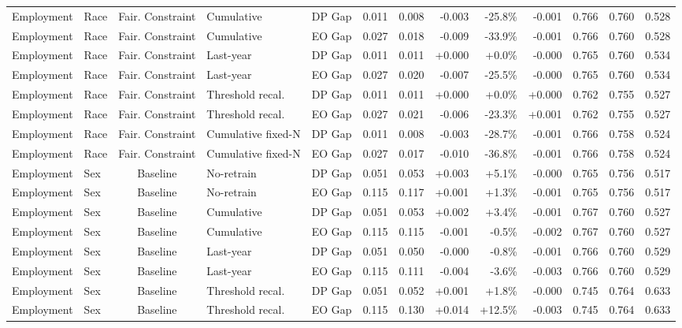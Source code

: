 \begin{longtable}{llcllrrrrrrrr}
Employment & Race & Fair. Constraint & Cumulative & DP Gap & 0.011 & 0.008 & -0.003 & -25.8\% & -0.001 & 0.766 & 0.760 & 0.528 \\
Employment & Race & Fair. Constraint & Cumulative & EO Gap & 0.027 & 0.018 & -0.009 & -33.9\% & -0.001 & 0.766 & 0.760 & 0.528 \\
Employment & Race & Fair. Constraint & Last-year & DP Gap & 0.011 & 0.011 & +0.000 & +0.0\% & -0.000 & 0.765 & 0.760 & 0.534 \\
Employment & Race & Fair. Constraint & Last-year & EO Gap & 0.027 & 0.020 & -0.007 & -25.5\% & -0.000 & 0.765 & 0.760 & 0.534 \\
Employment & Race & Fair. Constraint & Threshold recal. & DP Gap & 0.011 & 0.011 & +0.000 & +0.0\% & +0.000 & 0.762 & 0.755 & 0.527 \\
Employment & Race & Fair. Constraint & Threshold recal. & EO Gap & 0.027 & 0.021 & -0.006 & -23.3\% & +0.001 & 0.762 & 0.755 & 0.527 \\
Employment & Race & Fair. Constraint & Cumulative fixed-N & DP Gap & 0.011 & 0.008 & -0.003 & -28.7\% & -0.001 & 0.766 & 0.758 & 0.524 \\
Employment & Race & Fair. Constraint & Cumulative fixed-N & EO Gap & 0.027 & 0.017 & -0.010 & -36.8\% & -0.001 & 0.766 & 0.758 & 0.524 \\
Employment & Sex & Baseline & No-retrain & DP Gap & 0.051 & 0.053 & +0.003 & +5.1\% & -0.000 & 0.765 & 0.756 & 0.517 \\
Employment & Sex & Baseline & No-retrain & EO Gap & 0.115 & 0.117 & +0.001 & +1.3\% & -0.001 & 0.765 & 0.756 & 0.517 \\
Employment & Sex & Baseline & Cumulative & DP Gap & 0.051 & 0.053 & +0.002 & +3.4\% & -0.001 & 0.767 & 0.760 & 0.527 \\
Employment & Sex & Baseline & Cumulative & EO Gap & 0.115 & 0.115 & -0.001 & -0.5\% & -0.002 & 0.767 & 0.760 & 0.527 \\
Employment & Sex & Baseline & Last-year & DP Gap & 0.051 & 0.050 & -0.000 & -0.8\% & -0.001 & 0.766 & 0.760 & 0.529 \\
Employment & Sex & Baseline & Last-year & EO Gap & 0.115 & 0.111 & -0.004 & -3.6\% & -0.003 & 0.766 & 0.760 & 0.529 \\
Employment & Sex & Baseline & Threshold recal. & DP Gap & 0.051 & 0.052 & +0.001 & +1.8\% & -0.000 & 0.745 & 0.764 & 0.633 \\
Employment & Sex & Baseline & Threshold recal. & EO Gap & 0.115 & 0.130 & +0.014 & +12.5\% & -0.003 & 0.745 & 0.764 & 0.633 \\

\end{longtable}
